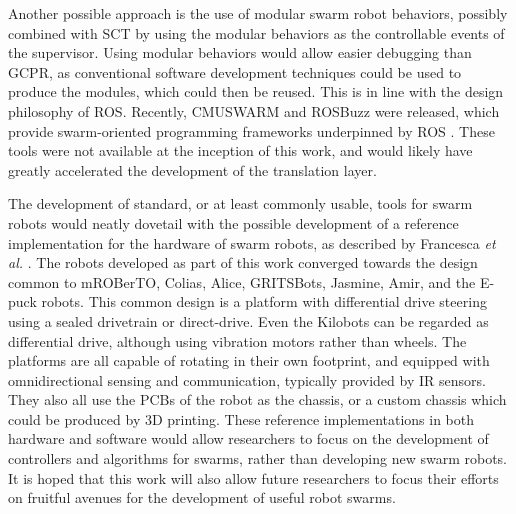 Another possible approach is the use of modular swarm robot behaviors, possibly combined with SCT by using the modular behaviors as the controllable events of the supervisor. 
Using modular behaviors would allow easier debugging than GCPR, as conventional software development techniques could be used to produce the modules, which could then be reused. 
This is in line with the design philosophy of ROS. 
Recently, CMUSWARM and ROSBuzz were released, which provide swarm-oriented programming frameworks underpinned by ROS \citep{arpino2018using, DBLP:journals/corr/abs-1710-08843}.
These tools were not available at the inception of this work, and would likely have greatly accelerated the development of the translation layer. 

The development of standard, or at least commonly usable, tools for swarm robots would neatly dovetail with the possible development of a reference implementation for the hardware of swarm robots, as described by Francesca \emph{et al.} \cite{francesca2014experiment}.
The robots developed as part of this work converged towards the design common to mROBerTO, Colias, Alice, GRITSBots, Jasmine, Amir, and the E-puck robots. 
This common design is a platform with differential drive steering using a sealed drivetrain or direct-drive. 
Even the Kilobots can be regarded as differential drive, although using vibration motors rather than wheels.
The platforms are all capable of rotating in their own footprint, and equipped with omnidirectional sensing and communication, typically provided by IR sensors.
They also all use the PCBs of the robot as the chassis, or a custom chassis which could be produced by 3D printing.  
These reference implementations in both hardware and software would allow researchers to focus on the development of controllers and algorithms for swarms, rather than developing new swarm robots.
It is hoped that this work will also allow future researchers to focus their efforts on fruitful avenues for the development of useful robot swarms.   

%
%	

